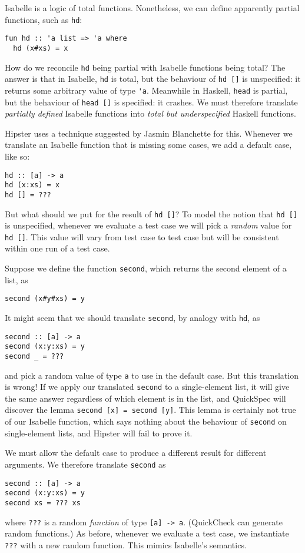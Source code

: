Isabelle is a logic of total functions. Nonetheless, we can define
apparently partial functions, such as \verb|hd|:
\begin{verbatim}
fun hd :: 'a list => 'a where
  hd (x#xs) = x
\end{verbatim}

How do we reconcile \verb|hd| being partial with Isabelle functions
being total? The answer is that in Isabelle, \verb|hd| is total, but
the behaviour of \verb|hd []| is unspecified: it returns some
arbitrary value of type \verb|'a|. Meanwhile in Haskell, \verb|head|
is partial, but the behaviour of \verb|head []| is specified: it
crashes. We must therefore translate \emph{partially defined} Isabelle
functions into \emph{total but underspecified} Haskell functions.

Hipster uses a technique suggested by Jasmin Blanchette
\cite{blanchettification} for this. Whenever we translate an Isabelle function
that is missing some cases, we add a default case, like so:
\begin{verbatim}
hd :: [a] -> a
hd (x:xs) = x
hd [] = ???
\end{verbatim}

But what should we put for the result of \verb|hd []|? To model the
notion that \verb|hd []| is unspecified, whenever we evaluate a test
case we will pick a \emph{random} value for \verb|hd []|. This value
will vary from test case to test case but will be consistent within
one run of a test case.

Suppose we define the function \verb|second|, which returns the second
element of a list, as
\begin{verbatim}
second (x#y#xs) = y
\end{verbatim}
It might seem that we should translate \verb|second|, by analogy with \verb|hd|, as
\begin{verbatim}
second :: [a] -> a
second (x:y:xs) = y
second _ = ???
\end{verbatim}
and pick a random value of type \verb|a| to use in the default case.
But this translation is wrong! If we apply our translated \verb|second|
to a single-element list, it will give the same answer regardless of which
element is in the list, and QuickSpec will discover the lemma
\verb|second [x] = second [y]|. This lemma is certainly not true of our
Isabelle function, which says nothing about the behaviour
of \verb|second| on single-element lists, and Hipster will fail to
prove it.

We must allow the default case to produce a different result for
different arguments. We therefore translate \verb|second| as
\begin{verbatim}
second :: [a] -> a
second (x:y:xs) = y
second xs = ??? xs
\end{verbatim}
where \verb|???| is a random \emph{function} of type \verb|[a] -> a|.
(QuickCheck can generate random functions.) As before, whenever we
evaluate a test case, we instantiate \verb|???| with a new random function.
This mimics Isabelle's semantics.

